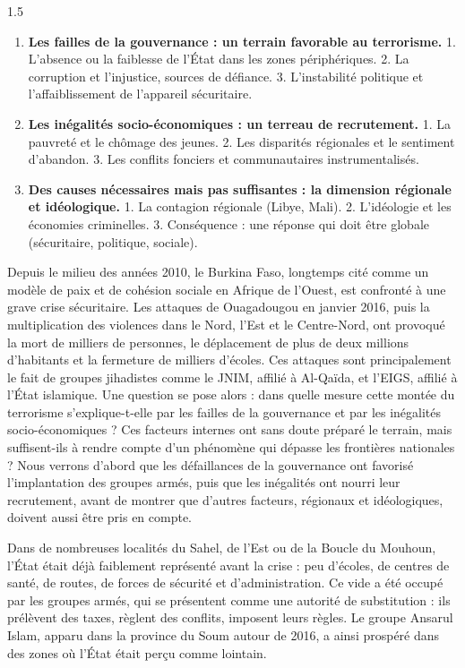 \documentclass[12pt]{article}
\begin{document}
\begin{spacing}{1.5}
\begin{enumerate}
\item[I.] \textbf{Les failles de la gouvernance : un terrain favorable au terrorisme.}
  1. L'absence ou la faiblesse de l'État dans les zones périphériques. 2. La corruption et l'injustice, sources de défiance. 3. L'instabilité politique et l'affaiblissement de l'appareil sécuritaire.
\item[II.] \textbf{Les inégalités socio-économiques : un terreau de recrutement.}
  1. La pauvreté et le chômage des jeunes. 2. Les disparités régionales et le sentiment d'abandon. 3. Les conflits fonciers et communautaires instrumentalisés.
\item[III.] \textbf{Des causes nécessaires mais pas suffisantes : la dimension régionale et idéologique.}
  1. La contagion régionale (Libye, Mali). 2. L'idéologie et les économies criminelles. 3. Conséquence : une réponse qui doit être globale (sécuritaire, politique, sociale).
\end{enumerate}



Depuis le milieu des années 2010, le Burkina Faso, longtemps cité comme un modèle de paix et de cohésion sociale en Afrique de l'Ouest, est confronté à une grave crise sécuritaire. Les attaques de Ouagadougou en janvier 2016, puis la multiplication des violences dans le Nord, l'Est et le Centre-Nord, ont provoqué la mort de milliers de personnes, le déplacement de plus de deux millions d'habitants et la fermeture de milliers d'écoles. Ces attaques sont principalement le fait de groupes jihadistes comme le JNIM, affilié à Al-Qaïda, et l'EIGS, affilié à l'État islamique. Une question se pose alors : dans quelle mesure cette montée du terrorisme s'explique-t-elle par les failles de la gouvernance et par les inégalités socio-économiques ? Ces facteurs internes ont sans doute préparé le terrain, mais suffisent-ils à rendre compte d'un phénomène qui dépasse les frontières nationales ? Nous verrons d'abord que les défaillances de la gouvernance ont favorisé l'implantation des groupes armés, puis que les inégalités ont nourri leur recrutement, avant de montrer que d'autres facteurs, régionaux et idéologiques, doivent aussi être pris en compte.


Dans de nombreuses localités du Sahel, de l'Est ou de la Boucle du Mouhoun, l'État était déjà faiblement représenté avant la crise : peu d'écoles, de centres de santé, de routes, de forces de sécurité et d'administration. Ce vide a été occupé par les groupes armés, qui se présentent comme une autorité de substitution : ils prélèvent des taxes, règlent des conflits, imposent leurs règles. Le groupe Ansarul Islam, apparu dans la province du Soum autour de 2016, a ainsi prospéré dans des zones où l'État était perçu comme lointain.


\end{spacing}
\end{document}
